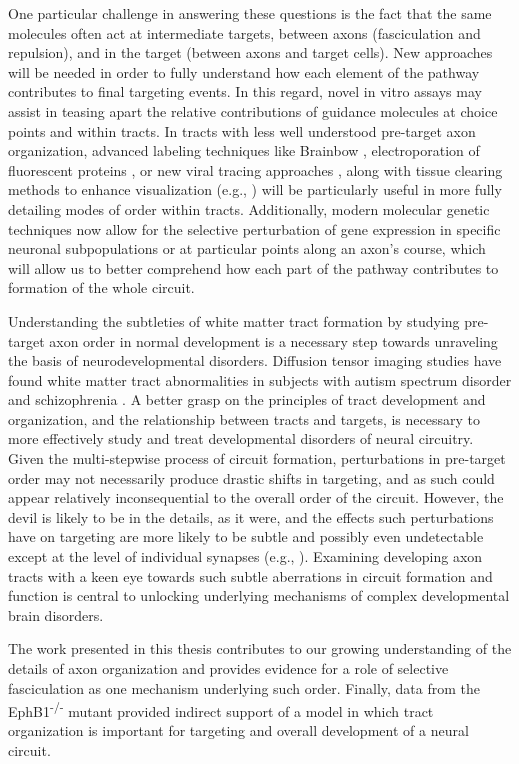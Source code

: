One particular challenge in answering these questions is the fact that the same molecules often act at intermediate targets, between axons (fasciculation and repulsion), and in the target (between axons and target cells).
New approaches will be needed in order to fully understand how each element of the pathway contributes to final targeting events.
In this regard, novel in vitro assays may assist in teasing apart the relative contributions of guidance molecules at choice points and within tracts.
In tracts with less well understood pre-target axon organization, advanced labeling techniques like Brainbow \cite{lu2009interscutularis}, electroporation of fluorescent proteins \cite{saito2001efficient}, or new viral tracing approaches \cite{reardon2016rabies}, along with tissue clearing methods to enhance visualization (e.g., ) will be particularly useful in more fully detailing modes of order within tracts.
Additionally, modern molecular genetic techniques now allow for the selective perturbation of gene expression in specific neuronal subpopulations or at particular points along an axon’s course, which will allow us to better comprehend how each part of the pathway contributes to formation of the whole circuit.

Understanding the subtleties of white matter tract formation by studying pre-target axon order in normal development is a necessary step towards unraveling the basis of neurodevelopmental disorders.
Diffusion tensor imaging studies have found white matter tract abnormalities in subjects with autism spectrum disorder \cite{wolff2012differences} and schizophrenia \cite{kubicki2007review}.
A better grasp on the principles of tract development and organization, and the relationship between tracts and targets, is necessary to more effectively study and treat developmental disorders of neural circuitry.
Given the multi-stepwise process of circuit formation, perturbations in pre-target order may not necessarily produce drastic shifts in targeting, and as such could appear relatively inconsequential to the overall order of the circuit.
However, the devil is likely to be in the details, as it were, and the effects such perturbations have on targeting are more likely to be subtle and possibly even undetectable except at the level of individual synapses (e.g., ).
Examining developing axon tracts with a keen eye towards such subtle aberrations in circuit formation and function is central to unlocking underlying mechanisms of complex developmental brain disorders.

The work presented in this thesis contributes to our growing understanding of the details of axon organization and provides evidence for a role of selective fasciculation as one mechanism underlying such order.
Finally, data from the EphB1\textsuperscript{-/-} mutant provided indirect support of a model in which tract organization is important for targeting and overall development of a neural circuit.